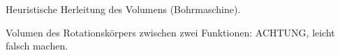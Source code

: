Heuristische Herleitung des Volumens (Bohrmaschine). 

Volumen des Rotationskörpers zwischen zwei Funktionen: ACHTUNG, leicht falsch machen. 

\begin{definition}[Rotationskörper]
    
\end{definition}

\begin{theorem}
    
\end{theorem}

\begin{proposition}
    
\end{proposition}
